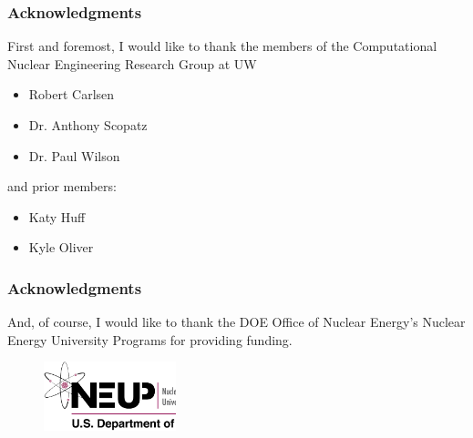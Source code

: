 \begin{frame}[ctb!]
  \frametitle{Acknowledgments}
  First and foremost, I would like to thank the members of the
  Computational Nuclear Engineering Research Group at UW 
  \begin{itemize}
    \item Robert Carlsen
    \item Dr. Anthony Scopatz
    \item Dr. Paul Wilson
  \end{itemize}
  
  \vspace{0.2cm}
  
  and prior members:
  \begin{itemize}
    \item Katy Huff
    \item Kyle Oliver
  \end{itemize}

\end{frame}

\begin{frame}[ctb!]
  \frametitle{Acknowledgments} 

  And, of course, I would like to thank the DOE Office of Nuclear Energy's
  Nuclear Energy University Programs for providing funding.
  \begin{figure}[htbp!]
    \begin{center}
      \includegraphics[height=2cm]{neup.ps}
    \end{center}
    \label{fig:neup}
  \end{figure}
\end{frame}
